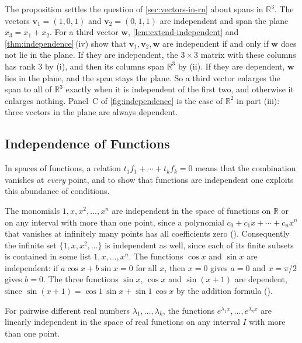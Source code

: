 The proposition settles the question of \cref{sec:vectors-in-rn} about spans in $\mathbb R^3$. The vectors $\mathbf v_1=(1,0,1)$ and $\mathbf v_2=(0,1,1)$ are independent and span the plane $x_3=x_1+x_2$. For a third vector $\mathbf w$, \cref{lem:extend-independent} and \cref{thm:independence}\,(iv) show that $\mathbf v_1,\mathbf v_2,\mathbf w$ are independent if and only if $\mathbf w$ does not lie in the plane. If they are independent, the $3\times3$ matrix with these columns has rank $3$ by (i), and then its columns span $\mathbb R^3$ by (ii). If they are dependent, $\mathbf w$ lies in the plane, and the span stays the plane. So a third vector enlarges the span to all of $\mathbb R^3$ exactly when it is independent of the first two, and otherwise it enlarges nothing. Panel~C of \cref{fig:independence} is the case of $\mathbb R^2$ in part (iii): three vectors in the plane are always dependent.

\subsection{Independence of Functions}

In spaces of functions, a relation $t_1f_1+\cdots+t_kf_k=0$ means that the combination vanishes at \emph{every} point, and to show that functions are independent one exploits this abundance of conditions.

The monomials $1,x,x^2,\ldots,x^n$ are independent in the space of functions on $\mathbb R$ or on any interval with more than one point, since a polynomial $c_0+c_1x+\cdots+c_nx^n$ that vanishes at infinitely many points has all coefficients zero (). Consequently the infinite set $\{1,x,x^2,\ldots\}$ is independent as well, since each of its finite subsets is contained in some list $1,x,\ldots,x^n$. The functions $\cos x$ and $\sin x$ are independent: if $a\cos x+b\sin x=0$ for all $x$, then $x=0$ gives $a=0$ and $x=\pi/2$ gives $b=0$. The three functions $\sin x$, $\cos x$ and $\sin(x+1)$ are dependent, since $\sin(x+1)=\cos1\,\sin x+\sin1\,\cos x$ by the addition formula ().

\begin{proposition}
\label{prop:exponentials-independent}
For pairwise different real numbers $\lambda_1,\ldots,\lambda_k$, the functions $e^{\lambda_1x},\ldots,e^{\lambda_kx}$ are linearly independent in the space of real functions on any interval $I$ with more than one point.
\end{proposition}

